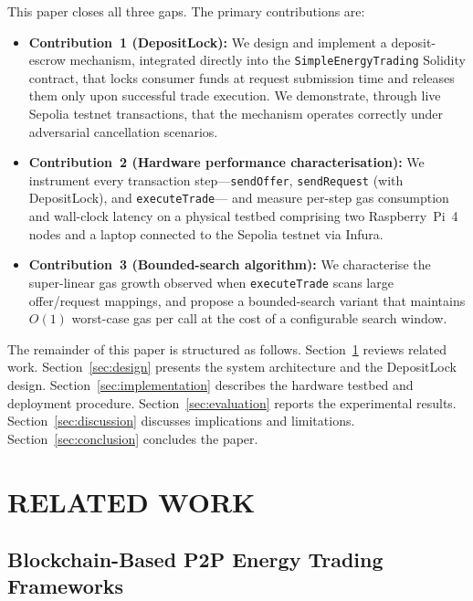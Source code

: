 \documentclass{IEEEoj}
\begin{document}
This paper closes all three gaps.
The primary contributions are:

\begin{itemize}
  \item \textbf{Contribution~1 (DepositLock):}
        We design and implement a deposit-escrow mechanism, integrated
        directly into the \texttt{SimpleEnergyTrading} Solidity contract,
        that locks consumer funds at request submission time and releases them
        only upon successful trade execution.
        We demonstrate, through live Sepolia testnet transactions, that the
        mechanism operates correctly under adversarial cancellation scenarios.

  \item \textbf{Contribution~2 (Hardware performance characterisation):}
        We instrument every transaction step---\texttt{sendOffer},
        \texttt{sendRequest} (with DepositLock), and \texttt{executeTrade}---
        and measure per-step gas consumption and wall-clock latency on a
        physical testbed comprising two Raspberry~Pi~4 nodes and a laptop
        connected to the Sepolia testnet via Infura.

  \item \textbf{Contribution~3 (Bounded-search algorithm):}
        We characterise the super-linear gas growth observed when
        \texttt{executeTrade} scans large offer/request mappings, and propose
        a bounded-search variant that maintains $O(1)$ worst-case gas per
        call at the cost of a configurable search window.
\end{itemize}

The remainder of this paper is structured as follows.
Section~\ref{sec:related} reviews related work.
Section~\ref{sec:design} presents the system architecture and
the DepositLock design.
Section~\ref{sec:implementation} describes the hardware testbed and
deployment procedure.
Section~\ref{sec:evaluation} reports the experimental results.
Section~\ref{sec:discussion} discusses implications and limitations.
Section~\ref{sec:conclusion} concludes the paper.


\section{RELATED WORK}
\label{sec:related}

\subsection{Blockchain-Based P2P Energy Trading Frameworks}
\end{document}
